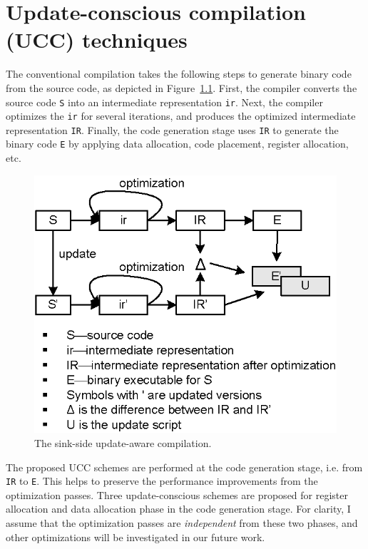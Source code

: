 \chapter{ Update-conscious compilation (UCC) techniques}

The conventional compilation takes the following steps to generate binary code from the source code, as depicted in
Figure~\ref{fover.sink}. First, the compiler converts the source code {\tt S} into an intermediate representation {\tt ir}. Next, the compiler optimizes the {\tt ir} for several iterations, and produces the optimized intermediate representation {\tt IR}. Finally, the code generation stage uses {\tt IR} to generate the binary code {\tt E} by applying data allocation, code placement, register allocation, etc.
\begin{figure}[htp]
\centering
\includegraphics[scale=1]{figures/com_sink.eps}
\caption{The sink-side update-aware compilation.}
\label{fover.sink}
\end{figure}

The proposed UCC schemes are performed at the code generation stage, i.e. from {\tt IR} to {\tt E}. This helps to preserve the performance improvements from the optimization passes. 
Three update-conscious schemes are proposed for register allocation and data allocation phase in the code generation stage. For clarity, I assume that the optimization passes are {\em independent} from these two phases, and other optimizations will be investigated in our future work.

